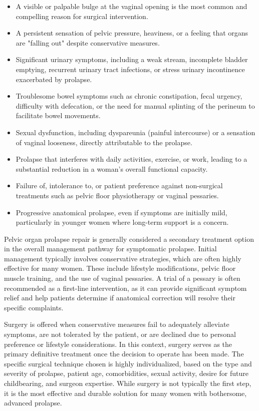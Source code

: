 \begin{itemize}
  \item A visible or palpable bulge at the vaginal opening is the most common and compelling reason for surgical intervention.
  \item A persistent sensation of pelvic pressure, heaviness, or a feeling that organs are "falling out" despite conservative measures.
  \item Significant urinary symptoms, including a weak stream, incomplete bladder emptying, recurrent urinary tract infections, or stress urinary incontinence exacerbated by prolapse.
  \item Troublesome bowel symptoms such as chronic constipation, fecal urgency, difficulty with defecation, or the need for manual splinting of the perineum to facilitate bowel movements.
  \item Sexual dysfunction, including dyspareunia (painful intercourse) or a sensation of vaginal looseness, directly attributable to the prolapse.
  \item Prolapse that interferes with daily activities, exercise, or work, leading to a substantial reduction in a woman's overall functional capacity.
  \item Failure of, intolerance to, or patient preference against non-surgical treatments such as pelvic floor physiotherapy or vaginal pessaries.
  \item Progressive anatomical prolapse, even if symptoms are initially mild, particularly in younger women where long-term support is a concern.
\end{itemize}

Pelvic organ prolapse repair is generally considered a secondary treatment option in the overall management pathway for symptomatic prolapse. Initial management typically involves conservative strategies, which are often highly effective for many women. These include lifestyle modifications, pelvic floor muscle training, and the use of vaginal pessaries. A trial of a pessary is often recommended as a first-line intervention, as it can provide significant symptom relief and help patients determine if anatomical correction will resolve their specific complaints.

Surgery is offered when conservative measures fail to adequately alleviate symptoms, are not tolerated by the patient, or are declined due to personal preference or lifestyle considerations. In this context, surgery serves as the primary definitive treatment once the decision to operate has been made. The specific surgical technique chosen is highly individualized, based on the type and severity of prolapse, patient age, comorbidities, sexual activity, desire for future childbearing, and surgeon expertise. While surgery is not typically the first step, it is the most effective and durable solution for many women with bothersome, advanced prolapse.

